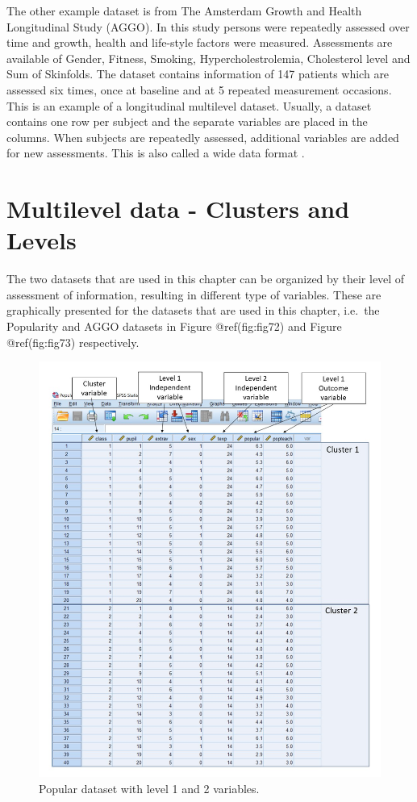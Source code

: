 \documentclass[
]{book}
\begin{document}
The other example dataset is from The Amsterdam Growth and Health
Longitudinal Study (AGGO). In this study persons were repeatedly
assessed over time and growth, health and life-style factors were
measured. Assessments are available of Gender, Fitness, Smoking,
Hypercholestrolemia, Cholesterol level and Sum of Skinfolds. The dataset
contains information of 147 patients which are assessed six times, once
at baseline and at 5 repeated measurement occasions. This is an example
of a longitudinal multilevel dataset. Usually, a dataset contains one
row per subject and the separate variables are placed in the columns.
When subjects are repeatedly assessed, additional variables are added
for new assessments. This is also called a wide data format .

\hypertarget{multilevel-data---clusters-and-levels}{%
\section{Multilevel data - Clusters and
Levels}\label{multilevel-data---clusters-and-levels}}

The two datasets that are used in this chapter can be organized by their
level of assessment of information, resulting in different type of
variables. These are graphically presented for the datasets that are
used in this chapter, i.e.~the Popularity and AGGO datasets in Figure
@ref(fig:fig72) and Figure @ref(fig:fig73) respectively.

\begin{figure}

{\centering \includegraphics[width=0.9\linewidth]{images/fig7.2_2} 

}

\caption{Popular dataset with level 1 and 2 variables.}\label{fig:fig72}
\end{figure}
\end{document}
